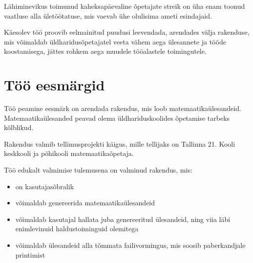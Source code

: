 Lähiminevikus toimunud kaheksapäevaline õpetajate streik \cite{hm-opetajate-streik} on üha enam toonud vaatluse alla ületöötatuse, mis vaevab ühe olulisima ameti esindajaid.

Käesolev töö proovib eelmainitud puudusi leevendada, arendades välja rakenduse, mis võimaldab üldharidusõpetajatel veeta vähem aega ülesannete ja tööde koostamisega, jättes rohkem aega muudele tööalastele toimingutele.

\section{Töö eesmärgid}

Töö peamine eesmärk on arendada rakendus, mis loob matemaatikaülesandeid. Matemaatikaülesanded peavad olema üldhariduskoolides õpetamise tarbeks kõlblikud.

Rakendus valmib tellimusprojekti käigus, mille tellijaks on Tallinna 21. Kooli keskkooli ja põhikooli matemaatikaõpetaja.

Töö edukalt valmimise tulemusena on valminud rakendus, mis:

\begin{itemize}
  \item on kasutajasõbralik
  \item võimaldab genereerida matemaatikaülesandeid
  \item võimaldab kasutajal hallata juba genereeritud ülesandeid, ning viia läbi enimlevinuid haldustoiminguid olemitega
  \item võimaldab ülesandeid alla tõmmata failivormingus, mis soosib paberkandjale printimist
\end{itemize}


